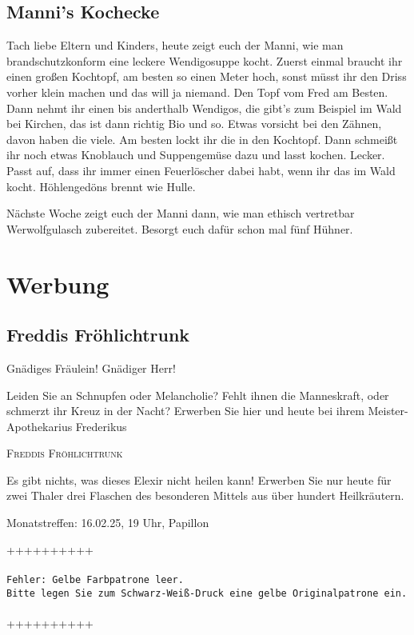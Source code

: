 \documentclass[final]{multiversum}
\begin{document}
\subsection{Manni's Kochecke}
Tach liebe Eltern und Kinders, heute zeigt euch der Manni, wie man
brandschutzkonform eine leckere Wendigosuppe kocht. Zuerst einmal braucht ihr
einen großen Kochtopf, am besten so einen Meter hoch, sonst müsst ihr den Driss
vorher klein machen und das will ja niemand. Den Topf vom Fred am Besten. 
Dann nehmt ihr einen bis anderthalb Wendigos, die gibt's zum Beispiel im Wald bei Kirchen, 
das ist dann richtig Bio und so. Etwas vorsicht bei den Zähnen, davon haben die viele. 
Am besten lockt ihr die in den Kochtopf. Dann schmeißt ihr noch etwas Knoblauch und Suppengemüse
dazu und lasst kochen. Lecker. Passt auf, dass ihr immer einen Feuerlöscher
dabei habt, wenn ihr das im Wald kocht. Höhlengedöns brennt wie Hulle.

Nächste Woche zeigt euch der Manni dann, wie man ethisch vertretbar
Werwolfgulasch zubereitet. Besorgt euch dafür schon mal fünf Hühner.


\section{Werbung}
\subsection{Freddis Fröhlichtrunk}
Gnädiges Fräulein! Gnädiger Herr!  

Leiden Sie an Schnupfen oder Melancholie? Fehlt ihnen die Manneskraft, oder schmerzt ihr Kreuz in der Nacht? Erwerben Sie hier und heute bei ihrem Meister-Apothekarius Frederikus

\begin{center}\textsc{Freddis Fröhlichtrunk}\end{center}

Es gibt nichts, was dieses Elexir nicht heilen kann! Erwerben Sie nur heute für zwei Thaler drei Flaschen des besonderen Mittels aus über hundert Heilkräutern. 

\begin{termine}
\item Monatstreffen: 16.02.25, 19 Uhr, Papillon
\end{termine}
\impressum

\newpage

\noindent ++++++++++\\
\\
\texttt{Fehler: Gelbe Farbpatrone leer.} \\
{\color{gray}
\texttt{Bitte legen Sie zum Schwarz-Weiß-Druck eine gelbe Originalpatrone ein.}}\\
\\
{\color{lightgray}++++++++++}
\end{document}
